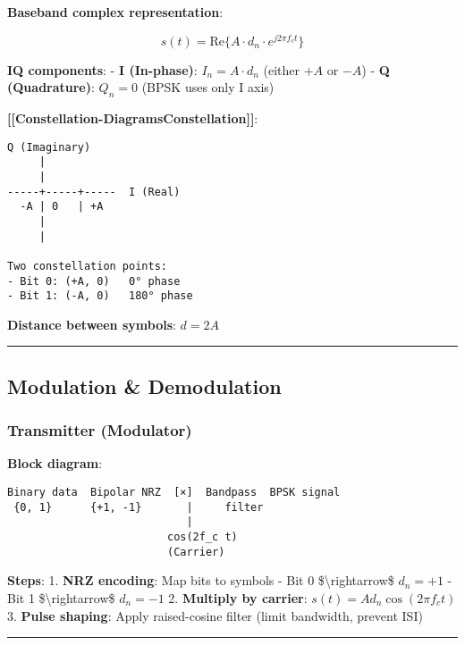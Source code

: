 \textbf{Baseband complex representation}:

\[
s(t) = \text{Re}\{A \cdot d_n \cdot e^{j2\pi f_c t}\}
\]

\textbf{IQ components}: - \textbf{I (In-phase)}: \(I_n = A \cdot d_n\)
(either \(+A\) or \(-A\)) - \textbf{Q (Quadrature)}: \(Q_n = 0\) (BPSK
uses only I axis)

\textbf{{[}{[}Constellation-Diagrams\textbar Constellation{]}{]}}:

\begin{verbatim}
Q (Imaginary)
     |
     |
-----+-----+-----  I (Real)
  -A | 0   | +A
     |
     |

Two constellation points:
- Bit 0: (+A, 0)   0° phase
- Bit 1: (-A, 0)   180° phase
\end{verbatim}

\textbf{Distance between symbols}: \(d = 2A\)

\begin{center}\rule{0.5\linewidth}{0.5pt}\end{center}

\subsection{Modulation \& Demodulation}\label{modulation-demodulation}

\subsubsection{Transmitter (Modulator)}\label{transmitter-modulator}

\textbf{Block diagram}:

\begin{verbatim}
Binary data  Bipolar NRZ  [×]  Bandpass  BPSK signal
 {0, 1}      {+1, -1}       |     filter
                            |
                         cos(2f_c t)
                         (Carrier)
\end{verbatim}

\textbf{Steps}: 1. \textbf{NRZ encoding}: Map bits to symbols - Bit 0
\$\textbackslash rightarrow\$ \(d_n = +1\) - Bit 1
\$\textbackslash rightarrow\$ \(d_n = -1\) 2. \textbf{Multiply by
carrier}: \(s(t) = A d_n \cos(2\pi f_c t)\) 3. \textbf{Pulse shaping}:
Apply raised-cosine filter (limit bandwidth, prevent ISI)

\begin{center}\rule{0.5\linewidth}{0.5pt}\end{center}

